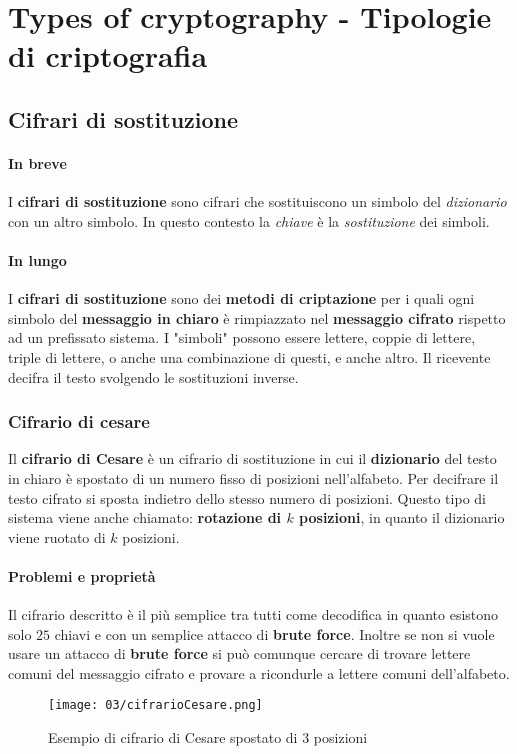 \section{Types of cryptography - Tipologie di criptografia}
    \subsection{Cifrari di sostituzione}
        \paragraph{In breve} I \textbf{cifrari di sostituzione} sono cifrari che sostituiscono un simbolo del \textit{dizionario} con un altro simbolo. In questo contesto la \textit{chiave} è la \textit{sostituzione} dei simboli.
        \paragraph{In lungo}
            I \textbf{cifrari di sostituzione} sono dei \textbf{metodi di criptazione} per i quali ogni simbolo del \textbf{messaggio in chiaro} è rimpiazzato nel \textbf{messaggio cifrato} rispetto ad un prefissato sistema. I "simboli" possono essere lettere, coppie di lettere, triple di lettere, o anche una combinazione di questi, e anche altro. Il ricevente decifra il testo svolgendo le sostituzioni inverse.
        \subsubsection{Cifrario di cesare}
            Il \textbf{cifrario di Cesare} è un cifrario di sostituzione in cui il \textbf{dizionario} del testo in chiaro è spostato di un numero fisso di posizioni nell'alfabeto. Per decifrare il testo cifrato si sposta indietro dello stesso numero di posizioni.\newline
            Questo tipo di sistema viene anche chiamato: \textbf{rotazione di $k$ posizioni}, in quanto il dizionario viene ruotato di $k$ posizioni.
            \paragraph{Problemi e proprietà} Il cifrario descritto è il più semplice tra tutti come decodifica in quanto esistono solo $25$ chiavi e con un semplice attacco di \textbf{brute force}. Inoltre se non si vuole usare un attacco di \textbf{brute force} si può comunque cercare di trovare lettere comuni del messaggio cifrato e provare a ricondurle a lettere comuni dell'alfabeto.
            \begin{figure}[H]
                \centering
                \texttt{[image: 03/cifrarioCesare.png]}
                \caption{Esempio di cifrario di Cesare spostato di 3 posizioni}
            \end{figure}
